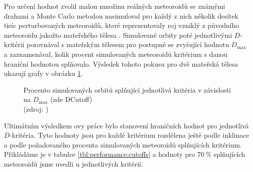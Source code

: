 \smallskip

Pro určení hodnot zvolil malou množinu reálných meteoroidů se známými drahami a Monte Carlo metodou nasimuloval pro každý z nich několik desítek tisíc perturbovaných meteoroidů, které reprezentovaly roj vzniklý z původního meteoroidu jakožto mateřského tělesa \cite{galligan}. Simulované orbity poté jednotlivými $D$-kritérii porovnával s mateřským tělesem pro postupně se zvyšující hodnotu $D_\text{max}$ a zaznamenával, kolik procent simulovaných meteoroidů kritérium s danou hraniční hodnotou splňovalo. Výsledek tohoto pokusu pro dvě mateřská tělesa ukazují grafy v obrázku \ref{img:performance:recovery}.

\begin{figure}[ht]
    \centering
    \hfill
    \caption[Procento simulovaných orbitů splňující $D$-kritéria]{
        Procento simulovaných orbitů splňující jednotlivá kritéria v závislosti na $D_\text{max}$ (zde \textsf{DCutoff})\\
        {\small (zdroj: \cite{galligan})}
    }
    \label{img:performance:recovery}
\end{figure}

\medskip

Ultimátním výsledkem \citeauthor{galligan}ovy práce bylo stanovení hraničních hodnot pro jednotlivá $D$-kritéria. Tyto hodnoty jsou pro každé kritérium rozdělena ještě podle inklinace a podle požadovaného procenta simulovaných meteoroidů splňujících kritérium. Přikládáme je v tabulce \ref{tbl:performance:cutoffs} a hodnoty pro $70\:\%$ splňujících meteoroidů jsme uvedli u jednotlivých kritérií.

